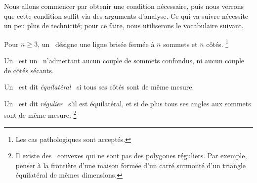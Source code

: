 Nous allons commencer par obtenir une condition nécessaire, puis nous verrons que cette condition suffit via des arguments d'analyse.
Ce qui va suivre nécessite un peu plus de technicité; pour ce faire, nous utiliserons le vocabulaire suivant.




\begin{defi}
	Pour $n \geq 3$, un \og \emph{\ncycle} \fg\ désigne une ligne brisée fermée à $n$ sommets et $n$ côtés.%
	\footnote{
		Les cas pathologiques sont acceptés.
	}
\end{defi}


\begin{defi}
	Un \og \emph{\ngone} \fg\ est un \ncycle\ n'admettant aucun couple de sommets confondus, ni aucun couple de côtés sécants.
\end{defi}


\begin{defi}
	Un \ngone\ est dit \og \emph{équilatéral} \fg\ si tous ses côtés sont de même mesure.
\end{defi}


\begin{defi}
	Un \ngone\ est dit \og \emph{régulier} \fg\ s'il est équilatéral, et si de plus tous ses angles aux sommets sont de même mesure.%
	\footnote{
		Il existe des \nequis\ convexes qui ne sont pas des polygones réguliers. Par exemple, penser à la frontière d'une maison formée d'un carré surmonté d'un triangle équilatéral de mêmes dimensions.
	}
\end{defi}
